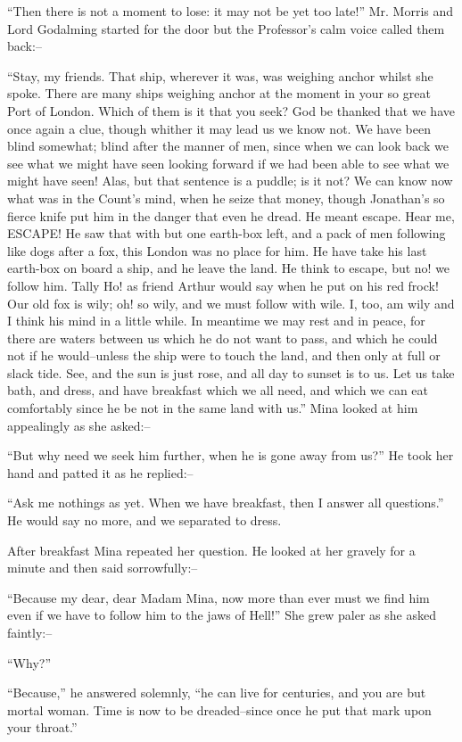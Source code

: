 \documentclass[12pt,openright]{book}
\begin{document}
“Then there is not a moment to lose: it may not be yet too late!” Mr. Morris and Lord Godalming started for the door but the Professor’s calm voice called them back:–

“Stay, my friends. That ship, wherever it was, was weighing anchor whilst she spoke. There are many ships weighing anchor at the moment in your so great Port of London. Which of them is it that you seek? God be thanked that we have once again a clue, though whither it may lead us we know not. We have been blind somewhat; blind after the manner of men, since when we can look back we see what we might have seen looking forward if we had been able to see what we might have seen! Alas, but that sentence is a puddle; is it not? We can know now what was in the Count’s mind, when he seize that money, though Jonathan’s so fierce knife put him in the danger that even he dread. He meant escape. Hear me, ESCAPE! He saw that with but one earth-box left, and a pack of men following like dogs after a fox, this London was no place for him. He have take his last earth-box on board a ship, and he leave the land. He think to escape, but no! we follow him. Tally Ho! as friend Arthur would say when he put on his red frock! Our old fox is wily; oh! so wily, and we must follow with wile. I, too, am wily and I think his mind in a little while. In meantime we may rest and in peace, for there are waters between us which he do not want to pass, and which he could not if he would–unless the ship were to touch the land, and then only at full or slack tide. See, and the sun is just rose, and all day to sunset is to us. Let us take bath, and dress, and have breakfast which we all need, and which we can eat comfortably since he be not in the same land with us.” Mina looked at him appealingly as she asked:–

“But why need we seek him further, when he is gone away from us?” He took her hand and patted it as he replied:–

“Ask me nothings as yet. When we have breakfast, then I answer all questions.” He would say no more, and we separated to dress.

After breakfast Mina repeated her question. He looked at her gravely for a minute and then said sorrowfully:–

“Because my dear, dear Madam Mina, now more than ever must we find him even if we have to follow him to the jaws of Hell!” She grew paler as she asked faintly:–

“Why?”

“Because,” he answered solemnly, “he can live for centuries, and you are but mortal woman. Time is now to be dreaded–since once he put that mark upon your throat.”
\end{document}
